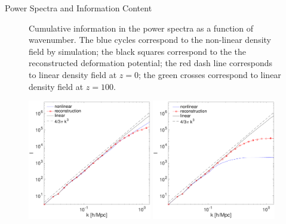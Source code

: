 \begin{section}{Power Spectra and Information Content}
\begin{figure}[t!]
\begin{center}
   \caption{Cumulative information in the power spectra as a function of wavenumber. The blue 
cycles correspond to the non-linear density field by simulation; the black squares correspond 
to the the reconstructed deformation potential; the red dash line corresponds to linear density 
field at $z=0$; the green crosses correspond to linear density field at $z=100$.}
  \label{fig:fisherinfo}
 \end{center}
\end{figure}
\begin{figure}[t!]
\centering
  \includegraphics[width=0.48\textwidth]{fisher_tr-crop.pdf}
  \includegraphics[width=0.48\textwidth]{fisher_trr2-crop.pdf}
\end{figure}

\end{section}
